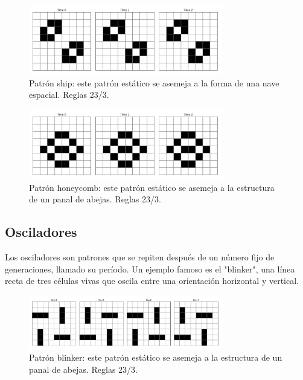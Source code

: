 \documentclass[]{article}
\begin{document}
\begin{figure}[H]
  \centering
  \includegraphics[width=0.75\textwidth]{../assets/still_life/ship/ship.png}
  \caption{Patrón ship: este patrón estático se asemeja a la forma de una nave espacial. Reglas 23/3.}
  \label{fig:ship}
  \end{figure}

\begin{figure}[H]
  \centering
  \includegraphics[width=0.75\textwidth]{../assets/still_life/honeycomb/honeycomb.png}
  \caption{Patrón honeycomb: este patrón estático se asemeja a la estructura de un panal de abejas. Reglas 23/3.}
  \label{fig:honeycomb}
  \end{figure}


\subsection{Osciladores}
Los osciladores son patrones que se repiten después de un número fijo de generaciones, llamado su período. Un ejemplo famoso es el "blinker", una línea recta de tres células vivas que oscila entre una orientación horizontal y vertical.


\begin{figure}[H]
  \centering
  \includegraphics[width=0.75\textwidth]{../assets/oscillator/blinker/blinker.png}
  \caption{Patrón blinker: este patrón estático se asemeja a la estructura de un panal de abejas. Reglas 23/3.}
  \label{fig:blinker}
  \end{figure}
\end{document}

